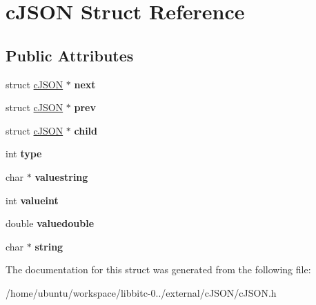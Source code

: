 \hypertarget{structcJSON}{\section{c\-J\-S\-O\-N Struct Reference}
\label{structcJSON}
}
\subsection*{Public Attributes}
\begin{DoxyCompactItemize}
\item 
\hypertarget{structcJSON_ade862b880379b5e2a591f7326401fa8d}{struct \hyperlink{structcJSON}{c\-J\-S\-O\-N} $\ast$ {\bfseries next}}\label{structcJSON_ade862b880379b5e2a591f7326401fa8d}

\item 
\hypertarget{structcJSON_a488a393f610347821fce8e985e79fc2f}{struct \hyperlink{structcJSON}{c\-J\-S\-O\-N} $\ast$ {\bfseries prev}}\label{structcJSON_a488a393f610347821fce8e985e79fc2f}

\item 
\hypertarget{structcJSON_a401b274c2da358dac5c23ab8b2c71f85}{struct \hyperlink{structcJSON}{c\-J\-S\-O\-N} $\ast$ {\bfseries child}}\label{structcJSON_a401b274c2da358dac5c23ab8b2c71f85}

\item 
\hypertarget{structcJSON_ab13084c574681593b12f6e0a3db0dcfc}{int {\bfseries type}}\label{structcJSON_ab13084c574681593b12f6e0a3db0dcfc}

\item 
\hypertarget{structcJSON_ad43f8de2571e504c4c5ce0a36990e6e1}{char $\ast$ {\bfseries valuestring}}\label{structcJSON_ad43f8de2571e504c4c5ce0a36990e6e1}

\item 
\hypertarget{structcJSON_a369cea49494eb5d4409d532a731a0fbf}{int {\bfseries valueint}}\label{structcJSON_a369cea49494eb5d4409d532a731a0fbf}

\item 
\hypertarget{structcJSON_a4b21817d0fd2919901abadac73214e7f}{double {\bfseries valuedouble}}\label{structcJSON_a4b21817d0fd2919901abadac73214e7f}

\item 
\hypertarget{structcJSON_aa6b47e9a4b0e0a26f519b1a2b6739983}{char $\ast$ {\bfseries string}}\label{structcJSON_aa6b47e9a4b0e0a26f519b1a2b6739983}

\end{DoxyCompactItemize}


The documentation for this struct was generated from the following file\-:\begin{DoxyCompactItemize}
\item 
/home/ubuntu/workspace/libbitc-\/0../external/c\-J\-S\-O\-N/c\-J\-S\-O\-N.\-h\end{DoxyCompactItemize}
